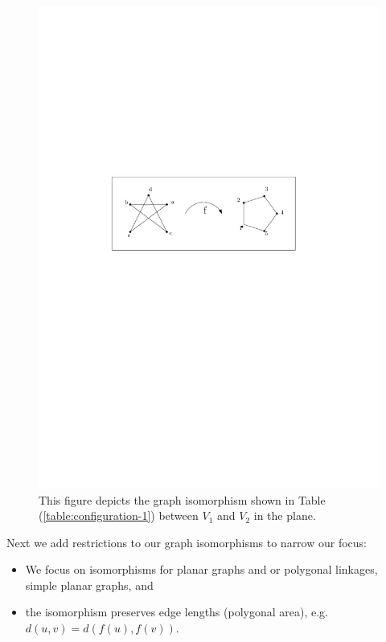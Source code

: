 \begin{figure}[!h]
\begin{center}
\includegraphics[scale=1]{graphics/graphIsomorphismExample.pdf}
\end{center} 
\caption{This figure depicts the graph isomorphism shown in Table 
(\ref{table:configuration-1}) between 
$V_1$ and $V_2$ in the plane.}
\label{fig:configuration-3}
\end{figure}
Next we add restrictions to our graph isomorphisms to narrow our focus:
\begin{itemize}
\item[\rn{1}] We focus on isomorphisms for planar graphs and or polygonal linkages, simple planar 
graphs, and
\item[\rn{2}] the isomorphism preserves edge lengths (polygonal area), e.g. $d(u,v) = d(f(u),f(v))$.
\end{itemize}  
